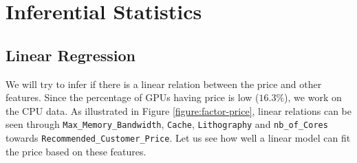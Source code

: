 \chapter{Inferential Statistics}

\section{Linear Regression}
We will try to infer if there is a linear relation between the price and other features. Since the percentage of GPUs having price is low ($16.3\%$), we work on the CPU data. As illustrated in Figure \ref{figure:factor-price}, linear relations can be seen through \texttt{Max\_Memory\_Bandwidth}, \texttt{Cache}, \texttt{Lithography} and \texttt{nb\_of\_Cores} towards \texttt{Recommended\_Customer\_Price}. Let us see how well a linear model can fit the price based on these features.

